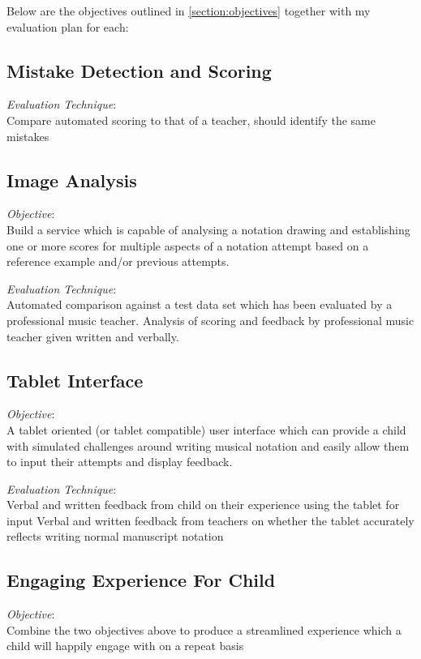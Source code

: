 Below are the objectives outlined in \cref{section:objectives} together with my evaluation plan for each:

\subsection{Mistake Detection and Scoring}

\emph{Evaluation Technique}: \\
Compare automated scoring to that of a teacher, should identify the same mistakes

\subsection{Image Analysis}

\emph{Objective}: \\
Build a service which is capable of analysing a notation drawing and establishing one or more scores for multiple aspects of a notation attempt based on a reference example and/or previous attempts.

\emph{Evaluation Technique}: \\
Automated comparison against a test data set which has been evaluated by a professional music teacher.
Analysis of scoring and feedback by professional music teacher given written and verbally.

\subsection{Tablet Interface}

\emph{Objective}: \\
A tablet oriented (or tablet compatible) user interface which can provide a child with simulated challenges around writing musical notation and easily allow them to input their attempts and display feedback.

\emph{Evaluation Technique}: \\
Verbal and written feedback from child on their experience using the tablet for input
Verbal and written feedback from teachers on whether the tablet accurately reflects writing normal manuscript notation

\subsection{Engaging Experience For Child}

\emph{Objective}: \\
Combine the two objectives above to produce a streamlined experience which a child will happily engage with on a repeat basis

